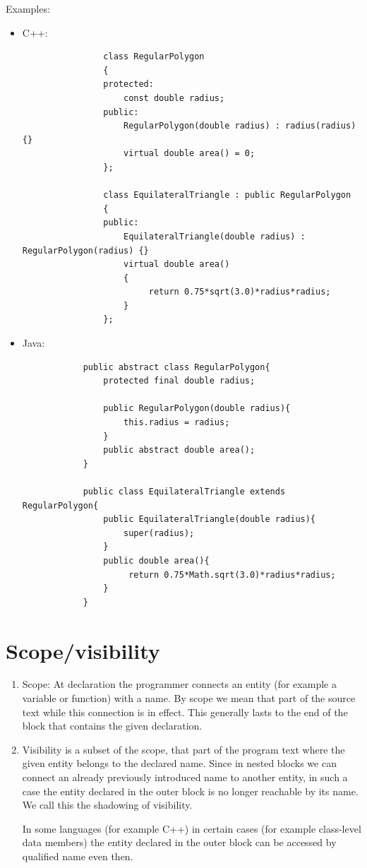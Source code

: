 \documentclass[margin=0px]{article}
\begin{document}
\noindent Examples:
\begin{itemize}
    \item	C++:
          \begin{verbatim}
                class RegularPolygon
                {
                protected:
                    const double radius;
                public:
                    RegularPolygon(double radius) : radius(radius) {}
                    virtual double area() = 0;
                };

                class EquilateralTriangle : public RegularPolygon
                {
                public:
                    EquilateralTriangle(double radius) : RegularPolygon(radius) {}
                    virtual double area()
                    {
                         return 0.75*sqrt(3.0)*radius*radius;
                    }
                };
            \end{verbatim}

    \item	Java:
          \begin{verbatim}
            public abstract class RegularPolygon{
                protected final double radius;

                public RegularPolygon(double radius){
                    this.radius = radius;
                }
                public abstract double area();
            }

            public class EquilateralTriangle extends RegularPolygon{
                public EquilateralTriangle(double radius){
                    super(radius);
                }
                public double area(){
                     return 0.75*Math.sqrt(3.0)*radius*radius;
                }
            }

            \end{verbatim}
\end{itemize}

\section{Scope/visibility}

\begin{enumerate}
    \item	Scope: At declaration the programmer connects an entity (for example a variable or function) with a name. By scope we mean that part of the source text while this connection is in effect. This generally lasts to the end of the block that contains the given declaration.

    \item	Visibility is a subset of the scope, that part of the program text where the given entity belongs to the declared name. Since in nested blocks we can connect an already previously introduced name to another entity, in such a case the entity declared in the outer block is no longer reachable by its name. We call this the shadowing of visibility.

          In some languages (for example C++) in certain cases (for example class-level data members) the entity declared in the outer block can be accessed by qualified name even then.
\end{enumerate}
\end{document}
